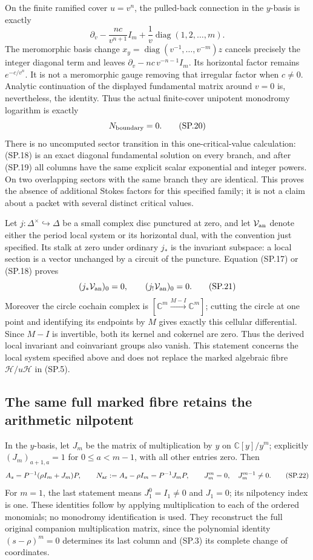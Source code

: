 On the finite ramified cover \(u=v^n\), the pulled-back
connection in the \(y\)-basis is exactly
\[
 \partial_v-\frac{nc}{v^{n+1}}I_m+
        \frac1v\operatorname{diag}(1,2,\ldots,m).
 \tag{SP.19}\label{CFStage:eq:sp-coverconnection}
\]
The meromorphic basis change \(x_y=\operatorname{diag}
(v^{-1},\ldots,v^{-m})z\) cancels precisely the integer
diagonal term and leaves
\(\partial_v-nc\,v^{-n-1}I_m\).
Its horizontal factor remains \(e^{-c/v^n}\).
It is not a meromorphic gauge removing that irregular factor
when \(c\ne0\). Analytic continuation of the displayed
fundamental matrix around \(v=0\) is, nevertheless, the
identity. Thus the actual finite-cover unipotent monodromy
logarithm is exactly
\[
 N_{\rm boundary}=0 .
 \tag{SP.20}\label{CFStage:eq:sp-Nboundary}
\]
There is no uncomputed sector transition in this one-critical-value
calculation: (SP.18) is an exact diagonal fundamental solution
on every branch, and after (SP.19) all columns have the same
explicit scalar exponential and integer powers. On two
overlapping sectors with the same branch they are identical.
This proves the absence of additional Stokes factors for this
specified family; it is not a claim about a packet with
several distinct critical values.

Let \(j:\Delta^\times\hookrightarrow\Delta\) be a small complex
disc punctured at zero, and let \(\mathcal V_{\rm an}\) denote
either the period local system or its horizontal dual, with the
convention just specified. Its stalk at zero under ordinary
\(j_*\) is the invariant subspace: a local section is a vector
unchanged by a circuit of the puncture. Equation (SP.17) or
(SP.18) proves
\[
 (j_*\mathcal V_{\rm an})_0=0,\qquad
 (j_!\mathcal V_{\rm an})_0=0.
 \tag{SP.21}\label{CFStage:eq:sp-analyticboundary}
\]
Moreover the circle cochain complex is
\([\mathbb C^m\xrightarrow{M-I}\mathbb C^m]\);
cutting the circle at one point and identifying its endpoints
by \(M\) gives exactly this cellular differential.
Since \(M-I\) is invertible, both its kernel and cokernel
are zero. Thus the derived local invariant and coinvariant
groups also vanish. This statement concerns the local system
specified above and does not replace the marked algebraic
fibre \(\mathcal H/u\mathcal H\) in (SP.5).

\subsection{The same full marked fibre retains the arithmetic nilpotent}

In the \(y\)-basis, let \(J_m\) be the matrix of multiplication
by \(y\) on \(\mathbb C[y]/y^m\); explicitly
\((J_m)_{a+1,a}=1\) for \(0\le a<m-1\), with all other
entries zero. Then
\[
 A_s=P^{-1}(\rho I_m+J_m)P,\qquad
 N_{\rm ar}:=A_s-\rho I_m=P^{-1}J_mP,\qquad
 J_m^m=0,\quad J_m^{m-1}\ne0 .
 \tag{SP.22}\label{CFStage:eq:sp-arithmetic}
\]
For \(m=1\), the last statement means \(J_1^0=I_1\ne0\)
and \(J_1=0\); its nilpotency index is one.
These identities follow by applying multiplication to each
of the ordered monomials; no monodromy identification is used.
They reconstruct the full original companion multiplication
matrix, since the polynomial identity \((s-\rho)^m=0\)
determines its last column and (SP.3) its complete change
of coordinates.

